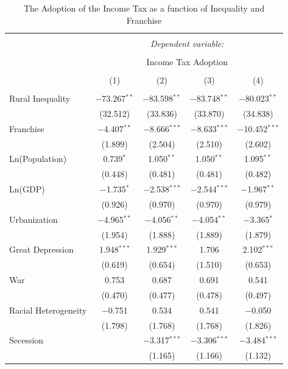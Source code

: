 \documentclass[letter, 12pt]{article}
\begin{document}
 \begin{table}[!htbp] \centering 
 	\caption{The Adoption of the Income Tax as a function of Inequality and Franchise} 
 	\label{} 
 	\begin{tabular}{@{\extracolsep{5pt}}lcccc} 
 		\\[-1.8ex]\hline 
 		\hline \\[-1.8ex] 
 		& \multicolumn{4}{c}{\textit{Dependent variable:}} \\ 
 		\cline{2-5} 
 		\\[-1.8ex] & \multicolumn{4}{c}{Income Tax Adoption} \\ 
 		\\[-1.8ex] & (1) & (2) & (3) & (4)\\ 
 		\hline \\[-1.8ex] 
 		Rural Inequality & $-$73.267$^{**}$ & $-$83.598$^{**}$ & $-$83.748$^{**}$ & $-$80.023$^{**}$ \\ 
 		& (32.512) & (33.836) & (33.870) & (34.838) \\ 
 		Franchise & $-$4.407$^{**}$ & $-$8.666$^{***}$ & $-$8.633$^{***}$ & $-$10.452$^{***}$ \\ 
 		& (1.899) & (2.504) & (2.510) & (2.602) \\ 
 		Ln(Population) & 0.739$^{*}$ & 1.050$^{**}$ & 1.050$^{**}$ & 1.095$^{**}$ \\ 
 		& (0.448) & (0.481) & (0.481) & (0.482) \\ 
 		Ln(GDP) & $-$1.735$^{*}$ & $-$2.538$^{***}$ & $-$2.544$^{***}$ & $-$1.967$^{**}$ \\ 
 		& (0.926) & (0.970) & (0.970) & (0.979) \\ 
 		Urbanization & $-$4.965$^{**}$ & $-$4.056$^{**}$ & $-$4.054$^{**}$ & $-$3.365$^{*}$ \\ 
 		& (1.954) & (1.888) & (1.889) & (1.879) \\ 
 		Great Depression & 1.948$^{***}$ & 1.929$^{***}$ & 1.706 & 2.102$^{***}$ \\ 
 		& (0.619) & (0.654) & (1.510) & (0.653) \\ 
 		War & 0.753 & 0.687 & 0.691 & 0.541 \\ 
 		& (0.470) & (0.477) & (0.478) & (0.497) \\ 
 		Racial Heterogeneity & $-$0.751 & 0.534 & 0.541 & $-$0.050 \\ 
 		& (1.798) & (1.768) & (1.768) & (1.826) \\ 
 		Secession &  & $-$3.317$^{***}$ & $-$3.306$^{***}$ & $-$3.484$^{***}$ \\ 
 		&  & (1.165) & (1.166) & (1.132) \\ 

\end{tabular}
\end{table}
\end{document}
